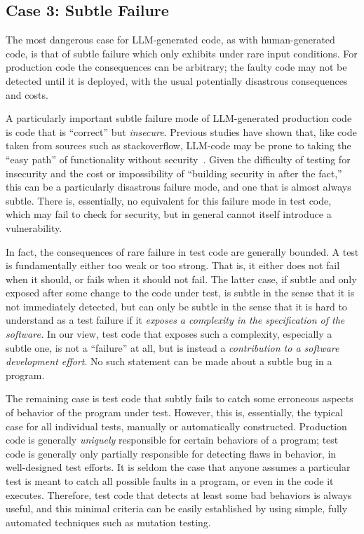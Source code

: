 \documentclass[sigconf,natbib=false]{acmart}
\begin{document}
\subsection{Case 3: Subtle Failure}

The most dangerous case for LLM-generated code, as with
human-generated code, is that of subtle failure which only exhibits
under rare input conditions.  For production code the consequences can
be arbitrary; the faulty code may not be detected until it is
deployed, with the usual potentially disastrous consequences and
costs.

A particularly important subtle failure mode of LLM-generated
production code is
code that is ``correct'' but \emph{insecure}.  Previous studies have
shown that, like code taken from sources such as stackoverflow,
LLM-code may be prone to taking the ``easy path'' of functionality
without security~\cite{pearce2022asleep,sandoval2023lost,siddiq2023generate}.  Given the
difficulty of testing for insecurity and the cost or impossibility of
``building security in after the fact,'' this can be a particularly
disastrous failure mode, and one that is almost always subtle.  There
is, essentially, no equivalent for this failure mode in test code,
which may fail to check for security, but in general cannot itself
introduce a vulnerability.

In fact, the consequences of rare failure in test code are generally
bounded.  A test is fundamentally either too weak or too strong.  That
is, it either does not fail when it should, or fails when it should
not fail.  The latter case, if subtle and only exposed after some
change to the code under test, is subtle in the sense that it is not
immediately detected, but can only be subtle in the sense that it is
hard to understand as a test failure if it \emph{exposes a complexity
  in the specification of the software.}  In our view, test code that
exposes such a complexity, especially a subtle one, is not a
``failure'' at all, but is instead a \emph{contribution to a software
  development effort}.  No such statement can be made about a subtle
bug in a program.

The remaining case is test code that subtly fails to catch some
erroneous aspects of behavior of the program under test.  However,
this is, essentially, the typical case for all individual tests,
manually or automatically constructed.  Production code is generally
\emph{uniquely} responsible for certain behaviors of a program; test code is
generally only partially responsible for detecting flaws in behavior,
in well-designed test efforts.  It is seldom the case that anyone
assumes a particular test is meant to catch all possible faults in a
program, or even in the code it executes.  Therefore, test code that detects at
least some bad behaviors is always useful, and this minimal criteria
can be easily established by using simple, fully automated techniques
such as mutation testing.
\end{document}

